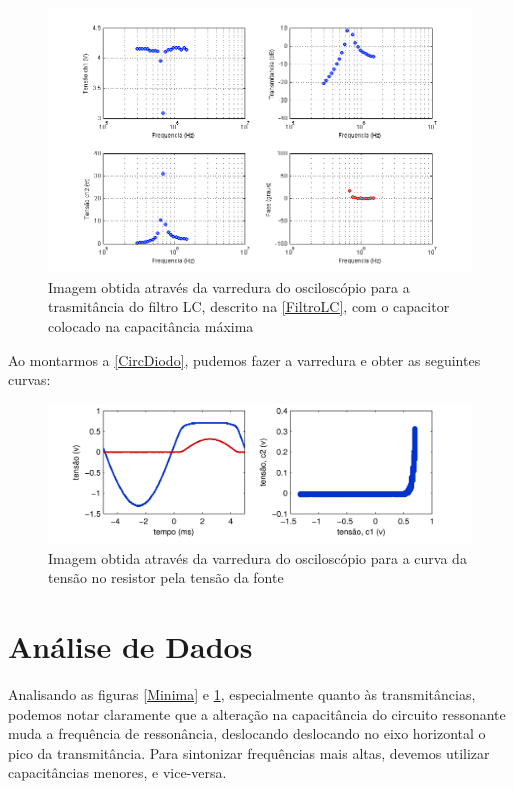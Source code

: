 \documentclass[11pt,a4paper]{article}
\begin{document}
        \begin{figure}[!htb]
        \centering
        \includegraphics[scale=0.8]{TMaxima.png}
        \caption{Imagem obtida através da varredura do osciloscópio para a trasmitância do filtro LC, descrito na \cref{FiltroLC}, com o capacitor colocado na capacitância máxima }
        \label{TMaxima}
        \end{figure}
    
    Ao montarmos a \cref{CircDiodo}, pudemos fazer a varredura e obter as seguintes curvas:
    
        \begin{figure}[!htb]
        \centering
        \includegraphics[scale=1]{CurvaDiodo.png}
        \caption{Imagem obtida através da varredura do osciloscópio para a curva da tensão no resistor pela tensão da fonte}
        \label{CurvaDiodo}
        \end{figure}
    
\section{Análise de Dados}

    Analisando as figuras \cref{Minima} e \cref{TMaxima}, especialmente quanto às transmitâncias, podemos notar claramente que a alteração na capacitância do circuito ressonante muda a frequência de ressonância, deslocando deslocando no eixo horizontal o pico da transmitância. Para sintonizar frequências mais altas, devemos utilizar capacitâncias menores, e vice-versa.
\end{document}
